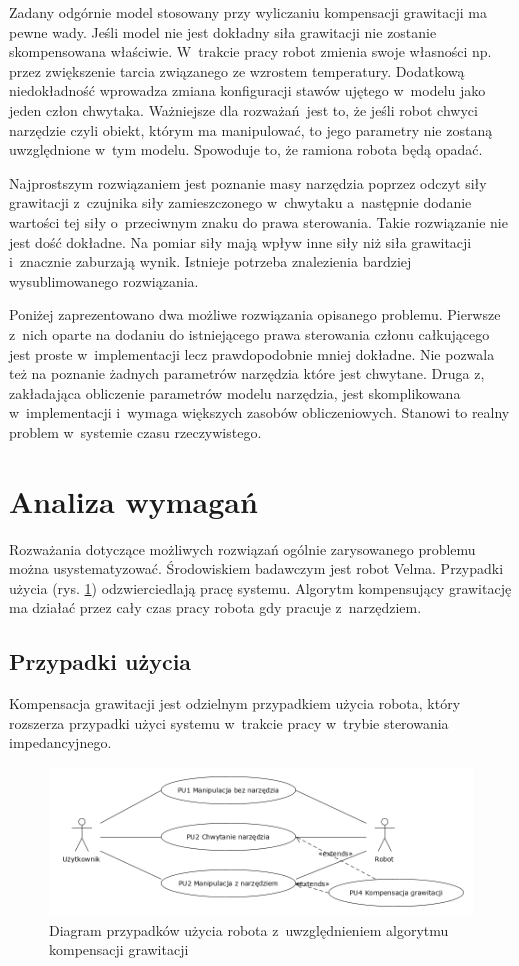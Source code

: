 Zadany odgórnie model stosowany przy wyliczaniu kompensacji grawitacji ma pewne wady. Jeśli model nie jest dokładny siła grawitacji nie zostanie skompensowana właściwie. W~trakcie pracy robot zmienia swoje własności np. przez zwiększenie tarcia związanego ze wzrostem temperatury. Dodatkową niedokładność wprowadza zmiana konfiguracji stawów ujętego w~modelu jako jeden człon chwytaka.  Ważniejsze dla rozważań jest to, że jeśli robot chwyci narzędzie czyli obiekt, którym ma manipulować, to jego parametry nie zostaną uwzględnione w~tym modelu. Spowoduje to, że ramiona robota będą opadać.

Najprostszym rozwiązaniem jest poznanie masy narzędzia poprzez odczyt siły grawitacji z~czujnika siły zamieszczonego w~chwytaku a~następnie dodanie wartości tej siły o~przeciwnym znaku do prawa sterowania. Takie rozwiązanie nie jest dość dokładne. Na pomiar siły mają wpływ inne siły niż siła grawitacji i~znacznie zaburzają wynik. Istnieje potrzeba znalezienia bardziej wysublimowanego rozwiązania.

Poniżej zaprezentowano dwa możliwe rozwiązania opisanego problemu. Pierwsze z~nich oparte na dodaniu do istniejącego prawa sterowania członu całkującego jest proste w~implementacji lecz prawdopodobnie mniej dokładne. Nie pozwala też na poznanie żadnych parametrów narzędzia które jest chwytane. Druga z, zakładająca obliczenie parametrów modelu narzędzia, jest skomplikowana w~implementacji i~wymaga większych zasobów obliczeniowych. Stanowi to realny problem w~systemie czasu rzeczywistego. 


\section{Analiza wymagań}
Rozważania dotyczące możliwych rozwiązań ogólnie zarysowanego problemu można usystematyzować. Środowiskiem badawczym jest robot Velma. Przypadki użycia (rys. \ref{fig:usecase}) odzwierciedlają pracę systemu. Algorytm kompensujący grawitację ma działać przez cały czas pracy robota gdy pracuje z~narzędziem. 
\subsection{Przypadki użycia}
Kompensacja grawitacji jest odzielnym przypadkiem  użycia robota, który rozszerza przypadki użyci systemu w~trakcie pracy w~trybie sterowania impedancyjnego.

\begin{figure}[H]
	\centering
	\includegraphics[width=.9\textwidth]{images/usecase.png}
	\caption{Diagram przypadków użycia robota z~uwzględnieniem algorytmu kompensacji grawitacji}
	\label{fig:usecase}
\end{figure}


